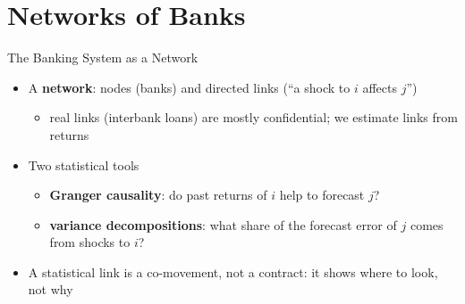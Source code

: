 \section{Networks of Banks}

\begin{frame}{The Banking System as a Network}
\itemsize{\small}
\begin{itemize}
    \item A \textbf{network}: nodes (banks) and directed links (``a shock to $i$ affects $j$'')
    \begin{itemize}
        \item real links (interbank loans) are mostly confidential; we estimate links from returns
    \end{itemize}
    \item Two statistical tools
    \begin{itemize}
        \item \textbf{Granger causality}: do past returns of $i$ help to forecast $j$? 
        \item \textbf{variance decompositions}: what share of the forecast error of $j$ comes from shocks to $i$? 
    \end{itemize}
    \item A statistical link is a co-movement, not a contract: it shows where to look, not why
\end{itemize}
\end{frame}

